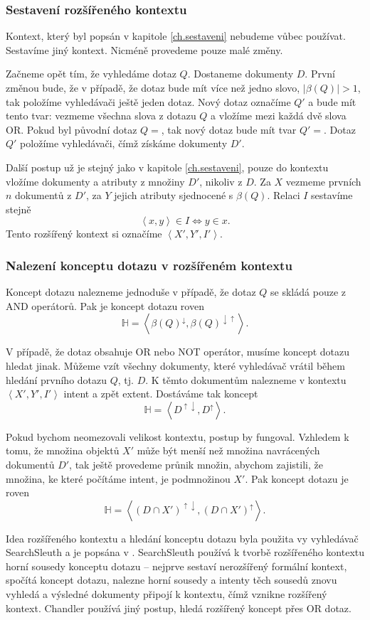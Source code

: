 \documentclass[12pt]{article}
\newcommand{\name}{Chandler}
\newcommand{\sssection}[1]{\subsubsection{#1}}
\newcommand{\addsp}[1]{\left<#1\right>}
\newcommand{\up}{^{\uparrow}}
\newcommand{\down}{^{\downarrow}}
\newcommand{\updown}{^{\uparrow\downarrow}}
\newcommand{\downup}{^{\downarrow\uparrow}}
\newcommand{\hledany}{\mathbb{H}}
\begin{document}
\sssection{Sestavení rozšířeného kontextu}
Kontext, který byl popsán v kapitole \ref{ch.sestaveni} nebudeme vůbec používat. Sestavíme jiný kontext. Nicméně provedeme pouze malé změny. 

Začneme opět tím, že vyhledáme dotaz $Q$. Dostaneme dokumenty $D$. První změnou bude, že v případě, že dotaz bude mít více než jedno slovo, $|\beta(Q)|>1$, tak položíme vyhledávači ještě jeden dotaz. Nový dotaz označíme $Q'$ a bude mít tento tvar: vezmeme všechna slova z dotazu $Q$ a vložíme mezi každá dvě slova OR. Pokud byl původní dotaz $Q=$, tak nový dotaz bude mít tvar $Q'=$. Dotaz $Q'$ položíme vyhledávači, čímž získáme dokumenty $D'$.

Další postup už je stejný jako v kapitole \ref{ch.sestaveni}, pouze do kontextu vložíme dokumenty a atributy z množiny $D'$, nikoliv z $D$. Za $X$ vezmeme prvních $n$ dokumentů z $D'$, za $Y$ jejich atributy sjednocené s $\beta(Q)$. Relaci $I$ sestavíme stejně
$$
\addsp{x,y} \in I \iff y \in x.
$$
Tento rozšířený kontext si označíme $\addsp{X', Y', I'}$. 

\sssection{Nalezení konceptu dotazu v rozšířeném kontextu}
Koncept dotazu nalezneme jednoduše v případě, že dotaz $Q$ se skládá pouze z AND operátorů. Pak je koncept dotazu roven
$$
\hledany=\addsp{\beta(Q)\down, \beta(Q)\downup}.
$$

V případě, že dotaz obsahuje OR nebo NOT operátor, musíme koncept dotazu hledat jinak. Můžeme vzít všechny dokumenty, které vyhledávač vrátil během hledání prvního dotazu $Q$, tj. $D$. K těmto dokumentům nalezneme v kontextu $\addsp{X', Y', I'}$ intent a zpět extent. Dostáváme tak koncept
$$
\hledany=\addsp{D\updown, D\up}.
$$

Pokud bychom neomezovali velikost kontextu, postup by fungoval. Vzhledem k tomu, že množina objektů $X'$ může být menší než množina navrácených dokumentů $D'$, tak ještě provedeme průnik množin, abychom zajistili, že množina, ke které počítáme intent, je podmnožinou $X'$. Pak koncept dotazu je roven
$$
\hledany=\addsp{(D\cap X')\updown, (D\cap X')\up}.
$$

Idea rozšířeného kontextu a hledání konceptu dotazu byla použita vy vyhledávač SearchSleuth a je popsána v \cite{searchsleuth}. Search\-Sleuth používá k tvorbě rozšířeného kontextu horní sousedy konceptu dotazu -- nejprve sestaví nerozšířený formální kontext, spočítá koncept dotazu, nalezne horní sousedy a intenty těch sousedů znovu vyhledá a výsledné dokumenty připojí k kontextu, čímž vznikne rozšířený kontext. \name{} používá jiný postup, hledá rozšířený koncept přes OR dotaz. 
\end{document}
